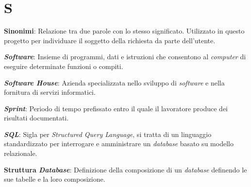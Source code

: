 \documentclass[5pt]{article}
\begin{document}
\section*{S}
\begin{flushleft}

\textbf{Sinonimi}: Relazione tra due parole con lo stesso significato. Utilizzato in questo progetto per individuare il soggetto della richiesta da parte dell'utente.\newline

\textbf{\textit{Software}}: Insieme di programmi, dati e istruzioni che consentono al \textit{computer} di eseguire determinate funzioni o compiti.\newline

\textbf{\textit{Software House}}: Azienda specializzata nello sviluppo di \textit{software} e nella fornitura di servizi informatici.\newline


\textbf{\textit{Sprint}}: Periodo di tempo prefissato entro il quale il lavoratore produce dei risultati documentati.\newline

\textbf{\textit{SQL}}: Sigla per \textit{Structured Query Language}, si tratta di un linguaggio standardizzato per interrogare e amministrare un \textit{database} basato su modello relazionale.\newline

\textbf{Struttura \textit{Database}}: Definizione della composizione di un \textit{database} definendo le sue tabelle e la loro composizione.\newline

\end{flushleft}

\pagebreak
\end{document}

